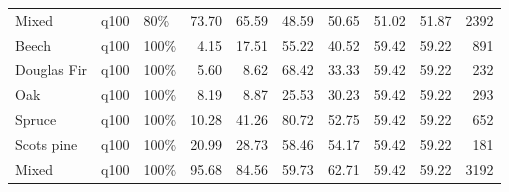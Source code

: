 \begin{longtable}{lllrrrrrrr}
  Mixed & q100 & 80\% & 73.70 & 65.59 & 48.59 & 50.65 & 51.02 & 51.87 & 2392 \\ 
  Beech & q100 & 100\% & 4.15 & 17.51 & 55.22 & 40.52 & 59.42 & 59.22 & 891 \\ 
  Douglas Fir & q100 & 100\% & 5.60 & 8.62 & 68.42 & 33.33 & 59.42 & 59.22 & 232 \\ 
  Oak & q100 & 100\% & 8.19 & 8.87 & 25.53 & 30.23 & 59.42 & 59.22 & 293 \\ 
  Spruce & q100 & 100\% & 10.28 & 41.26 & 80.72 & 52.75 & 59.42 & 59.22 & 652 \\ 
  Scots pine & q100 & 100\% & 20.99 & 28.73 & 58.46 & 54.17 & 59.42 & 59.22 & 181 \\ 
  Mixed & q100 & 100\% & 95.68 & 84.56 & 59.73 & 62.71 & 59.42 & 59.22 & 3192 \\ 
  \hline
\end{longtable}
\endgroup
